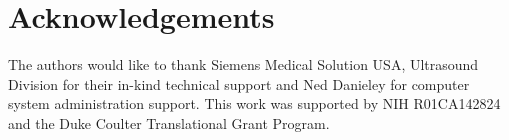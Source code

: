 \section*{Acknowledgements}
The authors would like to thank Siemens Medical Solution USA, Ultrasound
Division for their in-kind technical support and Ned Danieley for computer
system administration support.  This work was supported by NIH R01CA142824 and
the Duke Coulter Translational Grant Program.

